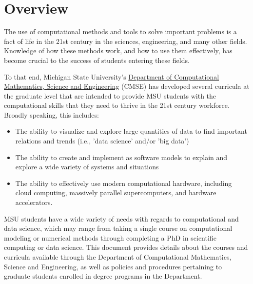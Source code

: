 \section{Overview}
\label{sec:overview}

The use of computational methods and tools to solve important problems
is a fact of life in the 21st century in the sciences, engineering,
and many other fields.  Knowledge of how these methods work, and how
to use them effectively, has become crucial to the success of students
entering these fields.

To that end, Michigan State University's \href{http://cmse.msu.edu}{Department of Computational
Mathematics, Science and Engineering} (CMSE) has developed several
curricula at the graduate level that are intended to provide MSU
students with the computational skills that they need to thrive in the
21st century workforce.  Broadly speaking, this includes:

\begin{itemize}
\item The ability to visualize and explore large quantities of data to
  find important relations and trends (i.e., 'data science' and/or
  'big data')

\item The ability to create and implement as software models to
  explain and explore a wide variety of systems and situations

\item The ability to effectively use modern computational hardware,
  including cloud computing, massively parallel supercomputers, and
  hardware accelerators.

\end{itemize}

MSU students have a wide variety of needs with regards to
computational and data science, which may range from taking a single
course on computational modeling or numerical methods through
completing a PhD in scientific computing or data science.  This
document provides details about the courses and curricula available
through the Department of Computational Mathematics, Science and
Engineering, as well as policies and procedures pertaining to graduate
students enrolled in degree programs in the Department.

